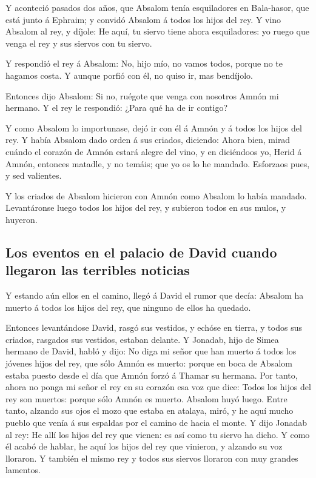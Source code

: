  Y aconteció pasados dos años, que Absalom tenía
esquiladores en Bala-hasor, que está junto á Ephraim; y convidó Absalom
á todos los hijos del rey.  Y vino Absalom al rey, y
díjole: He aquí, tu siervo tiene ahora esquiladores: yo ruego que venga
el rey y sus siervos con tu siervo.

 Y respondió el rey á Absalom: No, hijo mío, no vamos
todos, porque no te hagamos costa. Y aunque porfió con él, no quiso ir,
mas bendíjolo.

 Entonces dijo Absalom: Si no, ruégote que venga con
nosotros Amnón mi hermano. Y el rey le respondió: ¿Para qué ha de ir
contigo?

 Y como Absalom lo importunase, dejó ir con él á Amnón y
á todos los hijos del rey.  Y había Absalom dado orden á
sus criados, diciendo: Ahora bien, mirad cuándo el corazón de Amnón
estará alegre del vino, y en diciéndoos yo, Herid á Amnón, entonces
matadle, y no temáis; que yo os lo he mandado. Esforzaos pues, y sed
valientes.

 Y los criados de Absalom hicieron con Amnón como Absalom
lo había mandado. Levantáronse luego todos los hijos del rey, y subieron
todos en sus mulos, y huyeron.

\hypertarget{los-eventos-en-el-palacio-de-david-cuando-llegaron-las-terribles-noticias}{%
\subsection{Los eventos en el palacio de David cuando llegaron las
terribles
noticias}\label{los-eventos-en-el-palacio-de-david-cuando-llegaron-las-terribles-noticias}}

 Y estando aún ellos en el camino, llegó á David el rumor
que decía: Absalom ha muerto á todos los hijos del rey, que ninguno de
ellos ha quedado.

 Entonces levantándose David, rasgó sus vestidos, y
echóse en tierra, y todos sus criados, rasgados sus vestidos, estaban
delante.  Y Jonadab, hijo de Simea hermano de David,
habló y dijo: No diga mi señor que han muerto á todos los jóvenes hijos
del rey, que sólo Amnón es muerto: porque en boca de Absalom estaba
puesto desde el día que Amnón forzó á Thamar su hermana. 
Por tanto, ahora no ponga mi señor el rey en su corazón esa voz que
dice: Todos los hijos del rey son muertos: porque sólo Amnón es muerto.
 Absalom huyó luego. Entre tanto, alzando sus ojos el
mozo que estaba en atalaya, miró, y he aquí mucho pueblo que venía á sus
espaldas por el camino de hacia el monte.  Y dijo Jonadab
al rey: He allí los hijos del rey que vienen: es así como tu siervo ha
dicho.  Y como él acabó de hablar, he aquí los hijos del
rey que vinieron, y alzando su voz lloraron. Y también el mismo rey y
todos sus siervos lloraron con muy grandes lamentos.

